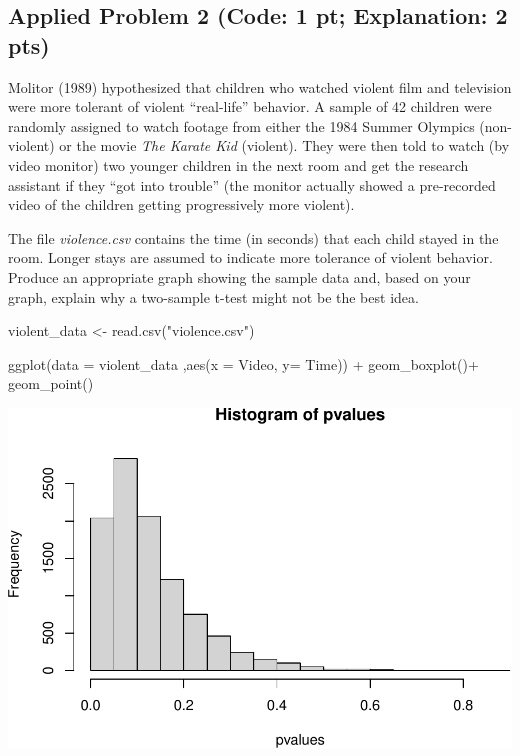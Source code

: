 \documentclass[
]{article}
\newenvironment{Shaded}{\begin{snugshade}}{\end{snugshade}}
\newcommand{\AttributeTok}[1]{\textcolor[rgb]{0.77,0.63,0.00}{#1}}
\newcommand{\FunctionTok}[1]{\textcolor[rgb]{0.00,0.00,0.00}{#1}}
\newcommand{\NormalTok}[1]{#1}
\newcommand{\OtherTok}[1]{\textcolor[rgb]{0.56,0.35,0.01}{#1}}
\newcommand{\SpecialCharTok}[1]{\textcolor[rgb]{0.00,0.00,0.00}{#1}}
\newcommand{\StringTok}[1]{\textcolor[rgb]{0.31,0.60,0.02}{#1}}
\begin{document}
\hypertarget{applied-problem-2-code-1-pt-explanation-2-pts}{%
\subsection{Applied Problem 2 (Code: 1 pt; Explanation: 2
pts)}\label{applied-problem-2-code-1-pt-explanation-2-pts}}

Molitor (1989) hypothesized that children who watched violent film and
television were more tolerant of violent ``real-life'' behavior. A
sample of 42 children were randomly assigned to watch footage from
either the 1984 Summer Olympics (non-violent) or the movie
\emph{The Karate Kid} (violent). They were then told to watch (by video
monitor) two younger children in the next room and get the research
assistant if they ``got into trouble'' (the monitor actually showed a
pre-recorded video of the children getting progressively more violent).

The file \emph{violence.csv} contains the time (in seconds) that each
child stayed in the room. Longer stays are assumed to indicate more
tolerance of violent behavior. Produce an appropriate graph showing the
sample data and, based on your graph, explain why a two-sample t-test
might not be the best idea.

\begin{Shaded}
\begin{Highlighting}[]
\NormalTok{violent\_data }\OtherTok{\textless{}{-}} \FunctionTok{read.csv}\NormalTok{(}\StringTok{"violence.csv"}\NormalTok{)}

\FunctionTok{ggplot}\NormalTok{(}\AttributeTok{data =}\NormalTok{ violent\_data ,}\FunctionTok{aes}\NormalTok{(}\AttributeTok{x =}\NormalTok{ Video, }\AttributeTok{y=}\NormalTok{ Time)) }\SpecialCharTok{+}
  \FunctionTok{geom\_boxplot}\NormalTok{()}\SpecialCharTok{+}
  \FunctionTok{geom\_point}\NormalTok{()}
\end{Highlighting}
\end{Shaded}

\includegraphics{Homework1_files/figure-latex/unnamed-chunk-5-1.pdf}
\end{document}
